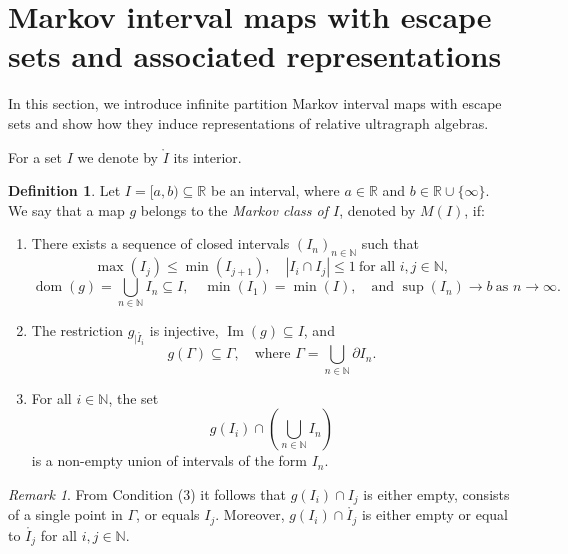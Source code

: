 \documentclass[12pt, reqno]{amsart}
\theoremstyle{definition}
\newtheorem{definition}[theorem]{Definition}
\theoremstyle{remark}
\newtheorem{remark}[theorem]{Remark}
\numberwithin{equation}{section}
\begin{document}
\section{Markov interval maps with escape sets and associated representations}
\label{secmarkovescape2}



In this section, we introduce infinite partition Markov interval maps with escape sets and show how they induce representations of relative ultragraph algebras.

For a set $I$ we denote by $\mathring{I}$ its interior.

\begin{definition}\label{Markovclass}
    Let $I = [a,b) \subseteq \mathbb{R}$ be an interval, where $a \in \mathbb{R}$ and $b \in \mathbb{R} \cup \{\infty\}$. 
    We say that a map $g$ belongs to the \emph{Markov class of $I$}, denoted by $M(I)$, if:
    \begin{enumerate}
        \item There exists a sequence of closed intervals $(I_n)_{n \in \mathbb{N}}$ such that 
        \[
        \max(I_j) \leq \min(I_{j+1}), \quad |I_i \cap I_j| \leq 1 \ \text{for all } i,j \in \mathbb{N},
        \]
        \[
        \operatorname{dom}(g) = \bigcup_{n \in \mathbb{N}} I_n \subseteq I, \quad 
        \min(I_1) = \min(I), \quad \text{and } \sup(I_n) \to b \ \text{as } n \to \infty.
        \]
        
        \item The restriction $g_{|\mathring{I_i}}$ is injective, $\operatorname{Im}(g) \subseteq I$, and 
        \[
        g(\Gamma) \subseteq \Gamma, \quad \text{where } \Gamma = \bigcup_{n \in \mathbb{N}} \partial I_n.
        \]

        \item For all $i \in \mathbb{N}$, the set 
        \[
        g(I_i) \cap \left( \bigcup_{n \in \mathbb{N}} I_n \right)
        \]
        is a non-empty union of intervals of the form $I_n$.
    \end{enumerate}  
\end{definition}

\begin{remark}\label{emptyorall}
    From Condition (3) it follows that $g(I_i) \cap I_j$ is either empty, consists of a single point in $\Gamma$, or equals $I_j$. 
    Moreover, $g(I_i) \cap \mathring{I_j}$ is either empty or equal to $\mathring{I_j}$ for all $i,j \in \mathbb{N}$.
\end{remark}
\end{document}
